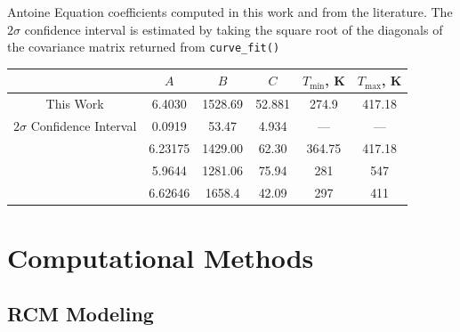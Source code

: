 \documentclass[letterpaper, review, sort&compress]{elsarticle}
\begin{document}
\begin{center}
    \captionsetup{type=table}
    \caption{Antoine Equation coefficients computed in this work and from the
    literature. The $2\sigma$ confidence interval is estimated by taking the
    square root of the diagonals of the covariance matrix returned from
    \texttt{curve\_fit()}}
    \label{tab:antoine}
    \begin{tabular}{cccccc}
        \toprule
        & $A$ & $B$ & $C$ & $T_{\text{min}}$, \si{\K} & $T_{\text{max}}$, \si{\K} \\
        \midrule
        This Work & 6.4030 & 1528.69 & 52.881 & 274.9 & 417.18 \\
        $2\sigma$ Confidence Interval & 0.0919 & 53.47 & 4.934 & --- & --- \\
        \citet{Ortega2003} & 6.23175 & 1429.00 & 62.30 & 364.75 & 417.18 \\
        \citet{Camacho2007} & 5.9644 & 1281.06 & 75.94 & 281 & 547 \\
        \citet{Stephenson1987} & 6.62646 & 1658.4 & 42.09 & 297 & 411 \\
        \bottomrule
    \end{tabular}
\end{center}

\section{Computational Methods}\label{sec:computational-methods}
\subsection{RCM Modeling}\label{sec:experimental-modeling}
\end{document}
